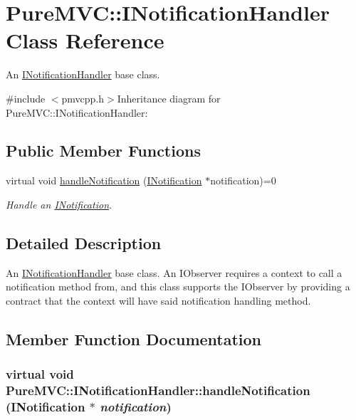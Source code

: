 \hypertarget{class_pure_m_v_c_1_1_i_notification_handler}{
\section{PureMVC::INotificationHandler Class Reference}
\label{class_pure_m_v_c_1_1_i_notification_handler}
}


An \hyperlink{class_pure_m_v_c_1_1_i_notification_handler}{INotificationHandler} base class.  


{\ttfamily \#include $<$pmvcpp.h$>$}Inheritance diagram for PureMVC::INotificationHandler:\subsection*{Public Member Functions}
\begin{DoxyCompactItemize}
\item 
virtual void \hyperlink{class_pure_m_v_c_1_1_i_notification_handler_af31efbe0929caff0ac371bf45d3e9c50}{handleNotification} (\hyperlink{class_pure_m_v_c_1_1_i_notification}{INotification} $\ast$notification)=0
\begin{DoxyCompactList}\small\item\em Handle an {\ttfamily \hyperlink{class_pure_m_v_c_1_1_i_notification}{INotification}}. \item\end{DoxyCompactList}\end{DoxyCompactItemize}


\subsection{Detailed Description}
An \hyperlink{class_pure_m_v_c_1_1_i_notification_handler}{INotificationHandler} base class. An IObserver requires a context to call a notification method from, and this class supports the IObserver by providing a contract that the context will have said notification handling method. 

\subsection{Member Function Documentation}
\hypertarget{class_pure_m_v_c_1_1_i_notification_handler_af31efbe0929caff0ac371bf45d3e9c50}{
\subsubsection[{handleNotification}]{\setlength{\rightskip}{0pt plus 5cm}virtual void PureMVC::INotificationHandler::handleNotification ({\bf INotification} $\ast$ {\em notification})}}
\label{class_pure_m_v_c_1_1_i_notification_handler_af31efbe0929caff0ac371bf45d3e9c50}


